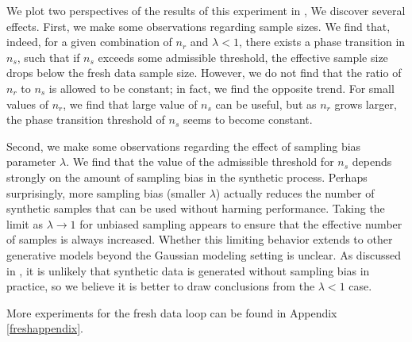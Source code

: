 \documentclass{article}
\def\bias{{\lambda}}
\def\colorFresh{colorC}
\def\fresh{\textcolor{\colorFresh}{fresh data loop}}
\begin{document}
We plot two perspectives of the results of this experiment in ,
We discover several effects. First, we make some observations regarding sample sizes. We find that, indeed, for a given combination of $n_r$ and $\lambda < 1$, there exists a phase transition in $n_s$, such that if $n_s$ exceeds some admissible threshold, the effective sample size drops below the fresh data sample size. However, we do not find that the ratio of $n_r$ to $n_s$ is allowed to be constant; in fact, we find the opposite trend. For small values of $n_r$, we find that large value of $n_s$ can be useful, but as $n_r$ grows larger, the phase transition threshold of $n_s$ seems to become constant. 


Second, we make some observations regarding the effect of sampling bias parameter $\bias$.
We find that the value of the admissible threshold for $n_s$ depends strongly on the amount of sampling bias in the synthetic process. Perhaps surprisingly, more sampling bias (smaller $\bias$) actually reduces the number of synthetic samples that can be used without harming performance. Taking the limit as $\lambda \to 1$ for unbiased sampling appears to ensure that the effective number of samples is always increased. Whether this limiting behavior extends to other generative models beyond the Gaussian modeling setting is unclear. As discussed in , it is unlikely that synthetic data is generated without sampling bias in practice, so we believe it is better to draw conclusions from the $\lambda < 1$ case.

More experiments for the \fresh{} can be found in Appendix \ref{freshappendix}.





\end{document}
